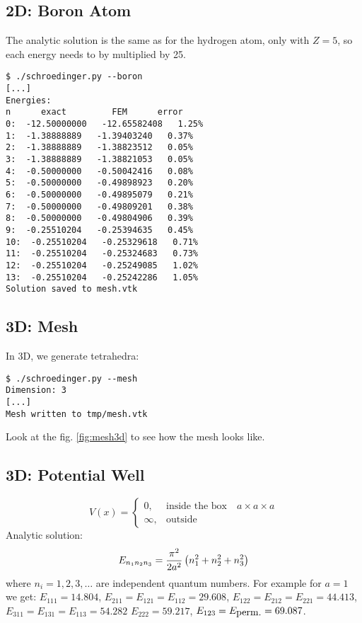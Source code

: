 \subsection{2D: Boron Atom}

The analytic solution is the same as for the hydrogen atom, only with $Z=5$,
so each energy needs to by multiplied by 25.

\begin{lstlisting}
$ ./schroedinger.py --boron
[...]
Energies:
n      exact         FEM      error
0:  -12.50000000   -12.65582408   1.25%
1:  -1.38888889   -1.39403240   0.37%
2:  -1.38888889   -1.38823512   0.05%
3:  -1.38888889   -1.38821053   0.05%
4:  -0.50000000   -0.50042416   0.08%
5:  -0.50000000   -0.49898923   0.20%
6:  -0.50000000   -0.49895079   0.21%
7:  -0.50000000   -0.49809201   0.38%
8:  -0.50000000   -0.49804906   0.39%
9:  -0.25510204   -0.25394635   0.45%
10:  -0.25510204   -0.25329618   0.71%
11:  -0.25510204   -0.25324683   0.73%
12:  -0.25510204   -0.25249085   1.02%
13:  -0.25510204   -0.25242286   1.05%
Solution saved to mesh.vtk
\end{lstlisting}

\subsection{3D: Mesh}

In 3D, we generate tetrahedra:

\begin{lstlisting}
$ ./schroedinger.py --mesh
Dimension: 3
[...]
Mesh written to tmp/mesh.vtk
\end{lstlisting}

Look at the fig. \ref{fig:mesh3d} to see how the mesh looks like.


\subsection{3D: Potential Well}

$$V(x)=\begin{cases}0,&\text{inside the box}\quad a\times a\times a \\
\infty, & \text{outside}\end{cases}$$
Analytic solution:
$$E_{n_1n_2n_3}={\pi^2\over2a^2}\left(n_1^2 + n_2^2 + n_3^2\right)$$
where $n_i = 1, 2, 3, \dots$ are independent quantum numbers.
For example for $a=1$ we get:
$E_{111}=14.804$, $E_{211}=E_{121}=E_{112}=29.608$,
$E_{122}=E_{212}=E_{221}=44.413$,
$E_{311}=E_{131}=E_{113}=54.282$
$E_{222}=59.217$, $E_{123}=E_{\hbox{perm.}}=69.087$.

